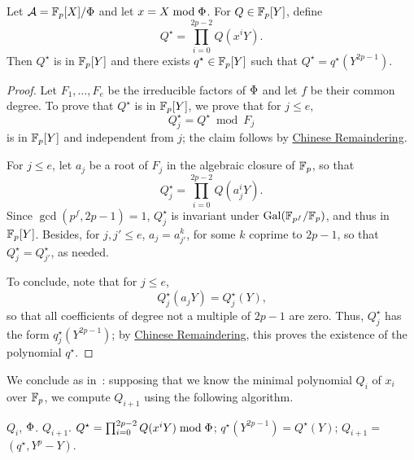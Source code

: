 \begin{lemma}
  \label{lemma:poly-cyclic}
  Let $\mathcal{A}=\mathbb{F}_p[X]/\Phi$ and let $x = X \bmod \Phi$. For
  $Q\in\mathbb{F}_p[Y]$, define 
  \begin{equation}
    Q^\star = \prod_{i=0}^{2p-2}Q(x^iY)
    \text{.}    
  \end{equation}
  Then $Q^\star$ is in $\mathbb{F}_p[Y]$ and there exists $q^\star\in\mathbb{F}_p[Y]$
  such that $Q^\star = q^\star(Y^{2p-1})$.
\end{lemma}
\begin{proof}
  Let $F_1,\dots,F_e$ be the irreducible factors of $\Phi$ and let
  $f$ be their common degree. To prove that $Q^\star$ is in $\mathbb{F}_p[Y]$,
  we prove that for $j \le e$, 
  \begin{equation}
    Q^\star_j = Q^\star \bmod F_j    
  \end{equation}
  is in $\mathbb{F}_p[Y]$ and independent from $j$; the claim follows by
  \hyperref[th:chinese-remainder]{Chinese Remaindering}.

  For $j \le e$, let $a_j$ be a root of $F_j$ in the algebraic closure
  of $\mathbb{F}_p$, so that
  \begin{equation}
    Q^\star_j = \prod_{i=0}^{2p-2}Q(a_j^iY)
    \text{.}
  \end{equation}
  Since $\gcd(p^f,2p-1)=1$, $Q^\star_j$ is invariant under
  $\operatorname{Gal}(\mathbb{F}_{p^f}/\mathbb{F}_p)$, and thus in $\mathbb{F}_p[Y]$. Besides, for
  $j,j'\le e$, $a_j = a_{j'}^k$, for some $k$ coprime to $2p-1$, so
  that $Q^\star_j= Q^\star_{j'}$, as needed.

  To conclude, note that for $j \le e$,
  \begin{equation}
    Q^\star_j(a_jY)=Q^\star_j(Y)
    \text{,}    
  \end{equation}
  so that all coefficients of degree not a multiple of $2p-1$ are
  zero.  Thus, $Q^\star_j$ has the form $q^\star_j(Y^{2p-1})$; by
  \hyperref[th:chinese-remainder]{Chinese Remaindering}, this proves
  the existence of the polynomial $q^\star$.
\end{proof}


We conclude as in~\cite{cantor89}: supposing that we know the minimal
polynomial $Q_i$ of $x_i$ over $\mathbb{F}_p$, we compute $Q_{i+1}$ using the
following algorithm.

\begin{algorithm}
  \caption{}
  \label{alg:minimalpolynomial}
  \begin{algorithmic}[1]
    \REQUIRE $Q_i$, $\Phi$.
    \ENSURE $Q_{i+1}$.
    \STATE \label{alg:minpol-Qstar}$Q^\star = \prod_{i=0}^{2p-2}Q(x^iY) \bmod \Phi$;
    \STATE \label{alg:minpol-qstar}$q^\star(Y^{2p-1}) = Q^\star(Y)$;
    \STATE \label{alg:minpol-Q}$Q_{i+1} =$ $(q^\star,Y^p-Y)$.
  \end{algorithmic}
\end{algorithm}


